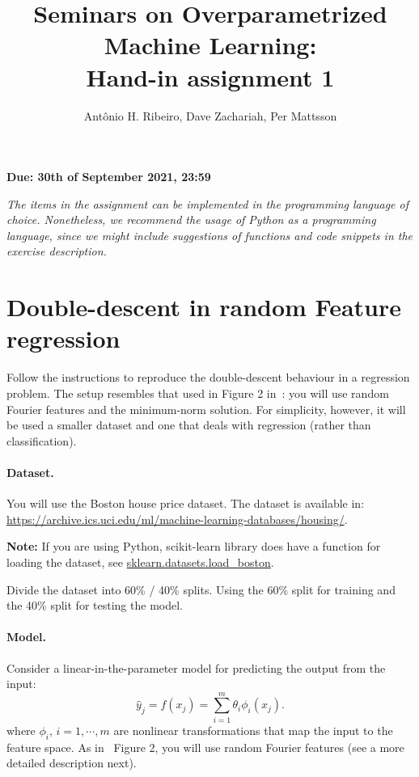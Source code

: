 \documentclass[a4paper,10pt]{article}
\title{Seminars on Overparametrized Machine Learning: \\Hand-in assignment 1}
\author{Antônio H. Ribeiro, Dave Zachariah, Per Mattsson}
\newcounter{exercise}
\newenvironment{note}
{
\begin{center}
\begin{lrbox}{\mybox}
\begin{minipage}{42em}}
{\end{minipage}
\end{lrbox}\fbox{\usebox{\mybox}}
\end{center}}
\begin{document}
\maketitle
\begin{center}
	\large \textbf{Due: 30th  of September 2021, 23:59}
\end{center}

\textit{
The items in the assignment can be implemented in the programming language of choice.
Nonetheless, we recommend the usage of Python as a programming language, since we might include suggestions of functions and code snippets in the exercise description.}



\section*{Double-descent in random Feature regression}


Follow the instructions to reproduce the double-descent behaviour in a regression problem. The setup resembles that used in Figure 2 in~\citep{belkin_reconciling_2019}: you will use random Fourier features and the minimum-norm solution. For simplicity, however, it will be used a smaller dataset and one that deals with regression (rather than classification).

\paragraph{Dataset.} You will use the Boston house price dataset. The dataset is available in:\\
    \href{https://archive.ics.uci.edu/ml/machine-learning-databases/housing/}{https://archive.ics.uci.edu/ml/machine-learning-databases/housing/}. 
    
    \begin{note}
    \textbf{Note:} If you are using Python, scikit-learn library does have a function for loading the dataset, see \href{https://scikit-learn.org/stable/modules/generated/sklearn.datasets.load_boston.html}{sklearn.datasets.load\_boston}.
    \end{note}
    
    Divide the dataset into 60\% / 40\% splits. Using the 60\% split for training and the 40\% split for testing the model.
    
\paragraph{Model.} Consider a linear-in-the-parameter model for predicting the output from the input:
    \begin{equation}
        \label{eq:nonlin-map}
        \hat{y}_j = f(x_j) = \sum_{i=1}^m \theta_i \phi_i(x_j). 
    \end{equation}
    where $\phi_i$, $i=1, \cdots, m$ are nonlinear transformations that map the input to  the feature space. As in~\citet{belkin_reconciling_2019} Figure 2, you will use random Fourier features (see a more detailed description next).
    
\end{document}
